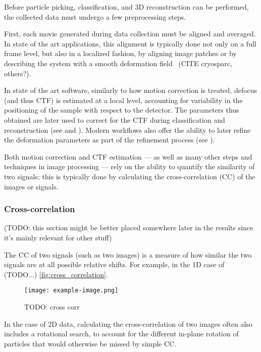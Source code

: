 Before particle picking, classification, and 3D reconstruction can be performed, the collected data must undergo a few preprocessing steps.

First, each movie generated during data collection must be aligned and averaged.
In state of the art applications, this alignment is typically done not only on a full frame level, but also in a localized fashion, by aligning image patches or by describing the system with a smooth deformation field~\cite{zhengMotionCor2AnisotropicCorrection2017} (CITE cryosparc, others?).

In state of the art software, similarly to how motion correction is treated, defocus (and thus CTF) is estimated at a local level, accounting for variability in the positioning of the sample with respect to the detector.
The parameters thus obtained are later used to correct for the CTF during classification and reconstruction (see  and ).
Modern workflows also offer the ability to later refine the deformation parameters as part of the refinement process (see ).

Both motion correction and CTF estimation --- as well as many other steps and techniques in image processing --- rely on the ability to quantify the similarity of two signals; this is typically done by calculating the cross-correlation (CC) of the images or signals.

\subsubsection{Cross-correlation}\label{cross_correlation}

(TODO: this section might be better placed somewhere later in the results since it's mainly relevant for other stuff)

The CC of two signals (such as two images) is a measure of how similar the two signals are at all possible relative shifts. For example, in the 1D case of (TODO...) \autoref{fig:cross_correlation}.

\begin{figure}[ht]
    \centering
    \texttt{[image: example-image.png]}
    \caption{TODO: cross corr}
    \label{fig:cross_correlation}
\end{figure}

In the case of 2D data, calculating the cross-correlation of two images often also includes a rotational search, to account for the different in-plane rotation of particles that would otherwise be missed by simple CC.

